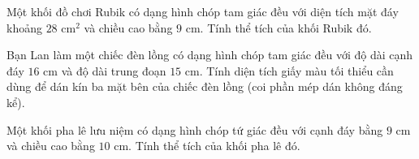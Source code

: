

\begin{bt}%
	Một khối đồ chơi Rubik có dạng hình chóp tam giác đều với diện tích mặt đáy khoảng $28\text{ cm}^2$ và chiều cao bằng $9\text{ cm}$. Tính thể tích của khối Rubik đó.
\end{bt}

\begin{bt}%
	Bạn Lan làm một chiếc đèn lồng có dạng hình chóp tam giác đều với độ dài cạnh đáy $16\text{ cm}$ và độ dài trung đoạn $15\text{ cm}$. Tính diện tích giấy màu tối thiểu cần dùng để dán kín ba mặt bên của chiếc đèn lồng (coi phần mép dán không đáng kể).
\end{bt}

\begin{bt}%
	Một khối pha lê lưu niệm có dạng hình chóp tứ giác đều với cạnh đáy bằng $9\text{ cm}$ và chiều cao bằng $10\text{ cm}$. Tính thể tích của khối pha lê đó.
\end{bt}
